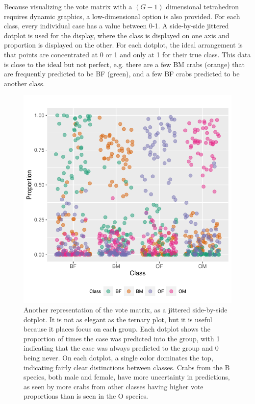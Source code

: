 \documentclass[smallextended,natbib]{svjour3}\usepackage[]{graphicx}\usepackage[]{xcolor}
\makeatletter
\def\maxwidth{ %
  \ifdim\Gin@nat@width>\linewidth
    \linewidth
  \else
    \Gin@nat@width
  \fi
}
\newenvironment{knitrout}{}{} %
\makeatother
\begin{document}
Because visualizing the vote matrix with a $(G-1)$ dimensional tetrahedron requires dynamic graphics, a low-dimensional option is also provided. For each class, every individual case has a value between 0-1. A side-by-side jittered dotplot is used for the display, where the class is displayed on one axis and proportion is displayed on the other. For each dotplot, the ideal arrangement is that points are concentrated at 0 or 1 and only at 1 for their true class. This data is close to the ideal but not perfect, e.g. there are a few BM crabs (orange) that are frequently predicted to be BF (green), and a few BF crabs predicted to be another class.

\begin{figure}[hbpt]
\centering
\begin{knitrout}
\color{fgcolor}
\includegraphics[width=\maxwidth]{side-1} 
\end{knitrout}
\caption{Another representation of the vote matrix, as a jittered side-by-side dotplot. It is not as elegant as the ternary plot, but it is useful because it places focus on each group. Each dotplot shows the proportion of times the case was predicted into the group, with 1 indicating that the case was always predicted to the group and 0 being never. On each dotplot, a single color dominates the top, indicating fairly clear distinctions between classes. Crabs from the B species, both male and female, have more uncertainty in predictions, as seen by more crabs from other classes having higher vote proportions than is seen in the O species.}
\label{sideby}
\end{figure}
\end{document}
